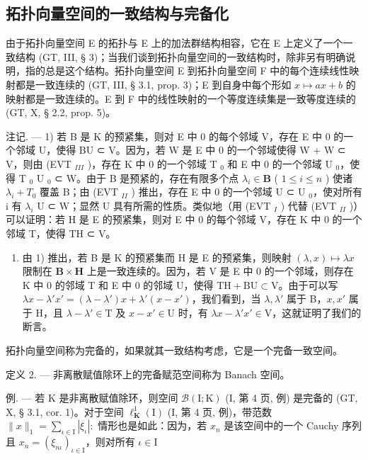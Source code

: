 \subsection{拓扑向量空间的一致结构与完备化}

由于拓扑向量空间 E 的拓扑与 E 上的加法群结构相容，它在 E 上定义了一个一致结构 (GT, III, § 3)；当我们谈到拓扑向量空间的一致结构时，除非另有明确说明，指的总是这个结构。拓扑向量空间 E 到拓扑向量空间 F 中的每个连续线性映射都是一致连续的 (GT, III, § 3.1, prop. 3)；E 到自身中每个形如 \(x \mapsto ax + b\) 的映射都是一致连续的。E 到 F 中的线性映射的一个等度连续集是一致等度连续的 (GT, X, § 2.2, prop. 5)。

注记. --- 1) 若 B 是 K 的预紧集，则对 E 中 0 的每个邻域 V，存在 E 中 0 的一个邻域 U，使得 BU ⊂ V。因为，若 W 是 E 中 0 的一个邻域使得 W + W ⊂ V，则由 (EVT \(_{III}\) )，存在 K 中 0 的一个邻域 T \(_{0}\) 和 E 中 0 的一个邻域 U \(_{0}\)，使得 T \(_{0}\) U \(_{0}\) ⊂ W。由于 B 是预紧的，存在有限多个点 \(\lambda_{i} \in \mathbf{B}\) ( \(1 \leqslant i \leqslant n\) ) 使诸 \(\lambda_{i} + T_{0}\) 覆盖 B；由 (EVT \(_{II}\) ) 推出，存在 E 中 0 的一个邻域 U ⊂ U \(_{0}\)，使对所有 i 有 \(\lambda_{i}\) U ⊂ W；显然 U 具有所需的性质。类似地（用 (EVT \(_{I}\) ) 代替 (EVT \(_{II}\) )）可以证明：若 H 是 E 的预紧集，则对 E 中 0 的每个邻域 V，存在 K 中 0 的一个邻域 T，使得 TH ⊂ V。

\begin{enumerate}
\def\labelenumi{\arabic{enumi})}
\setcounter{enumi}{1}
\tightlist
\item
  由 1) 推出，若 B 是 K 的预紧集而 H 是 E 的预紧集，则映射 \((\lambda, x) \mapsto \lambda x\) 限制在 \(\mathbf{B} \times \mathbf{H}\) 上是一致连续的。因为，若 V 是 E 中 0 的一个邻域，则存在 K 中 0 的邻域 T 和 E 中 0 的邻域 U，使得 \(\mathrm{TH} + \mathrm{BU} \subset \mathrm{V}\)。由于可以写 \(\lambda x - \lambda' x' = (\lambda - \lambda') x + \lambda'(x - x')\)，我们看到，当 \(\lambda, \lambda'\) 属于 B，\(x, x'\) 属于 H，且 \(\lambda - \lambda' \in \mathrm{T}\) 及 \(x - x' \in \mathrm{U}\) 时，有 \(\lambda x - \lambda' x' \in \mathrm{V}\)，这就证明了我们的断言。
\end{enumerate}

拓扑向量空间称为完备的，如果就其一致结构考虑，它是一个完备一致空间。

定义 2. --- 非离散赋值除环上的完备赋范空间称为 Banach 空间。

例. --- 若 K 是非离散赋值除环，则空间 \(\mathcal{B}(\mathrm{I};\mathrm{K})\) (I, 第 4 页, 例) 是完备的 (GT, X, § 3.1, cor. 1)。对于空间 \(\ell_{\mathbf{K}}^{1}(\mathrm{I})\) (I, 第 4 页, 例)，带范数 \(\| x\| _1 = \sum_{\iota \in \mathrm{I}}|\xi_\iota |:\) 情形也是如此：因为，若 \(x_{n}\) 是该空间中的一个 Cauchy 序列且 \(x_{n} = (\xi_{n\iota})_{\iota \in \mathrm{I}}\)，则对所有 \(\iota \in \mathrm{I}\)

